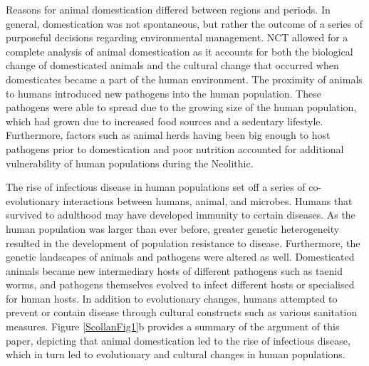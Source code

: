 Reasons for animal domestication differed between regions and periods. In general, domestication was not spontaneous, but rather the outcome of a series of purposeful decisions regarding environmental management. 
NCT allowed for a complete analysis of animal domestication as it accounts for both the biological change of domesticated animals and the cultural change that occurred when domesticates became a part of the human environment. The proximity of animals to humans introduced new pathogens into the human population. These pathogens were able to spread due to the growing size of the human population, which had grown due to increased food sources and a sedentary lifestyle. Furthermore, factors such as animal herds having been big enough to host pathogens prior to domestication and poor nutrition accounted for additional vulnerability of human populations during the Neolithic.

The rise of infectious disease in human populations set off a series of co-evolutionary interactions between humans, animal, and microbes. Humans that survived to adulthood may have developed immunity to certain diseases. As the human population was larger than ever before, greater genetic heterogeneity resulted in the development of population resistance to disease. Furthermore, the genetic landscapes of animals and pathogens were altered as well. Domesticated animals became new intermediary hosts of different pathogens such as taenid worms, and pathogens themselves evolved to infect different hosts or specialised for human hosts. In addition to evolutionary changes, humans attempted to prevent or contain disease through cultural constructs such as various sanitation measures. 
Figure \ref{ScollanFig1}b provides a summary of the argument of this paper, 
depicting that animal domestication led to the rise of infectious disease, which in turn led to evolutionary and cultural changes in human populations.

